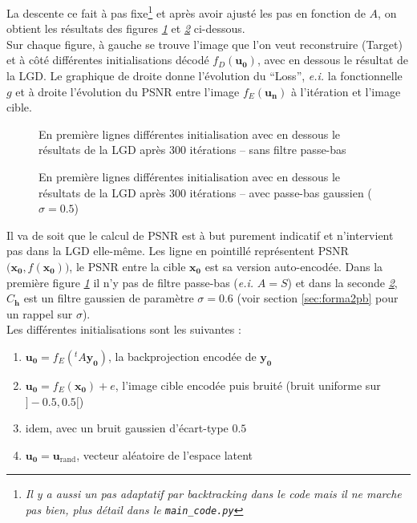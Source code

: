 \documentclass[hidelinks, french]{article} %
\newcommand{\ei}{\textit{e.i. }}
\renewcommand{\bf}[1]{\boldsymbol{#1}}
\theoremstyle{enonce}
\theoremstyle{special}
\theoremstyle{rq}
\theoremstyle{exo}
\theoremstyle{demo}
\begin{document}
La descente ce fait à pas fixe\footnote{\emph{Il y a aussi un pas adaptatif par backtracking dans le code mais il ne marche pas bien, plus détail dans le \texttt{main\_code.py}}} et après avoir ajusté les pas en fonction de $A$, on obtient les résultats des figures \textit{\ref{fig:LGDinits}} et \textit{\ref{fig:LGDinitg}} ci-dessous.
\\
Sur chaque figure, à gauche se trouve l'image que l'on veut reconstruire (Target) et à côté différentes initialisations décodé $f_D(\bf{u_0})$, avec en dessous le résultat de la LGD.
Le graphique de droite donne l'évolution du ``Loss'', \ei la fonctionnelle $g$ et à droite l'évolution du PSNR entre l'image $f_E(\bf{u_n})$ à l'itération et l'image cible.
\begin{figure}[H]\centering
    \caption{En première lignes différentes initialisation avec en dessous le résultats de la LGD après 300 itérations -- sans filtre passe-bas}
    \label{fig:LGDinits}
\end{figure}

\begin{figure}[H]\centering
    \caption{En première lignes différentes initialisation avec en dessous le résultats de la LGD après 300 itérations --  avec passe-bas gaussien ($\sigma=0.5$)}
    \label{fig:LGDinitg}
\end{figure}

Il va de soit que le calcul de PSNR est à but purement indicatif et n'intervient pas dans la LGD elle-même. Les ligne en pointillé représentent PSNR$\big(\bf{x_0},f(\bf{x_0})\big)$, le PSNR entre la cible $\bf{x_0}$ est sa version auto-encodée.
Dans la première figure \textit{\ref{fig:LGDinits}} il n'y pas de filtre passe-bas (\ei $A=S$) et dans la seconde \textit{\ref{fig:LGDinitg}}, $C_{\bf{h}}$ est un filtre gaussien de paramètre $\sigma=0.6$ (voir section \ref{sec:forma2pb} pour un rappel sur $\sigma$).
\\
Les différentes initialisations sont les suivantes :
\begin{enumerate}[label=(\arabic*)]
    \item $\bf{u_0}=f_E(^tA\bf{y_0})$, la backprojection encodée de $\bf{y_0}$
    \item $\bf{u_0}=f_E(\bf{x_0})+e$, l'image cible encodée puis bruité (bruit uniforme sur $]-0.5,0.5[$)
    \item idem, avec un bruit gaussien d'écart-type $0.5$
    \item $\bf{u_0}=\bf{u}_{\text{rand}}$,  vecteur aléatoire de l'espace latent
\end{enumerate}
\end{document}

